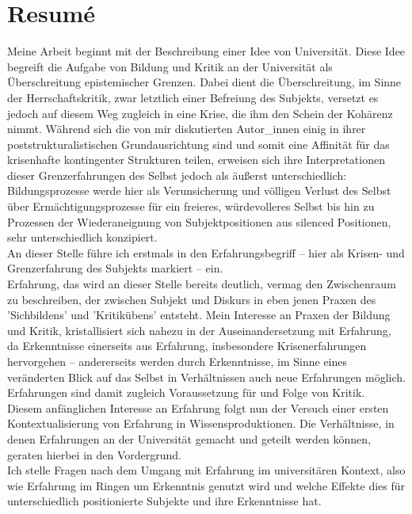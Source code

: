 \section{Resumé}

Meine Arbeit beginnt mit der Beschreibung einer Idee von Universität. Diese Idee
begreift die Aufgabe von Bildung und Kritik an der Universität als
Überschreitung epistemischer Grenzen. Dabei dient die Überschreitung, im Sinne
der Herrschaftskritik, zwar letztlich einer Befreiung des Subjekts, versetzt es
jedoch auf diesem Weg zugleich in eine Krise, die ihm den Schein der Kohärenz
nimmt. Während sich die von mir diskutierten Autor\_innen einig in ihrer
poststrukturalistischen Grundausrichtung sind und somit eine Affinität für das
krisenhafte kontingenter Strukturen teilen, erweisen sich ihre Interpretationen
dieser Grenzerfahrungen des Selbst jedoch als äußerst unterschiedlich:\\
Bildungsprozesse werde hier als Verunsicherung und völligen Verlust des Selbst
über Ermächtigungsprozesse für ein freieres, würdevolleres Selbst bis hin zu
Prozessen der Wiederaneignung von Subjektpositionen aus silenced Positionen,
sehr unterschiedlich konzipiert.\\
 An dieser Stelle führe ich erstmals in den
Erfahrungsbegriff – hier als Krisen- und Grenzerfahrung des Subjekts markiert –
ein.\\
 Erfahrung, das wird an dieser Stelle bereits deutlich, vermag den
Zwischenraum zu beschreiben, der zwischen Subjekt und Diskurs in eben jenen
Praxen des 'Sichbildens' und 'Kritikübens' entsteht. Mein Interesse an Praxen
der Bildung und Kritik, kristallisiert sich nahezu in der Auseinandersetzung mit
Erfahrung, da Erkenntnisse einerseits aus Erfahrung, insbesondere
Krisenerfahrungen hervorgehen – andererseits werden durch Erkenntnisse, im Sinne
eines veränderten Blick auf das Selbst in Verhältnissen auch neue Erfahrungen
möglich. Erfahrungen sind damit zugleich Voraussetzung für und Folge von Kritik.\\

\noindent Diesem anfänglichen Interesse an Erfahrung folgt nun der Versuch einer ersten
Kontextualisierung von Erfahrung in Wissensproduktionen. Die Verhältnisse, in
denen Erfahrungen an der Universität gemacht und geteilt werden können, geraten
hierbei in den Vordergrund. \\
Ich stelle Fragen nach dem Umgang mit Erfahrung im
universitären Kontext, also wie Erfahrung im Ringen um Erkenntnis genutzt wird
und welche Effekte dies für unterschiedlich positionierte Subjekte und ihre
Erkenntnisse hat.\\

